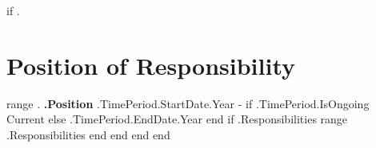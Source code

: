 {{if .}}
\section{Position of Responsibility}
\vspace{-5pt}
    \resumeSubHeadingListStart
    {{range .}}
        \resumeProjectHeading
            {\textbf{ {{.Position}} }} { {{.TimePeriod.StartDate.Year}} - {{if .TimePeriod.IsOngoing}} Current {{else}} {{.TimePeriod.EndDate.Year}} {{end}} }
            {{if .Responsibilities}}
            \resumeItemListStart
                {{range .Responsibilities}}
                {{end}}
            \resumeItemListEnd
            {{end}}
    {{end}}
    \resumeSubHeadingListEnd
    \vspace{-16pt}
{{end}}